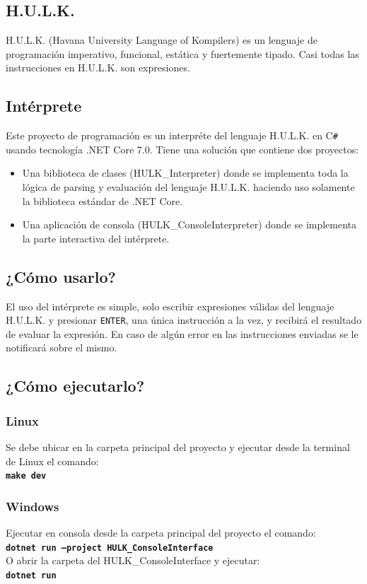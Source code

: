 \documentclass[12pt,a4paper]{article}
\begin{document}
\subsection{H.U.L.K.}\label{sub:hulk}
H.U.L.K. (Havana University Language of Kompilers) es un lenguaje de programación imperativo, funcional, estática y fuertemente tipado. Casi todas las instrucciones en H.U.L.K. son expresiones.
\subsection{Intérprete}\label{sub:interpreter}
Este proyecto de programación es un interpréte del lenguaje H.U.L.K. en C\texttt{\#} usando tecnología .NET Core 7.0. Tiene una solución que contiene dos proyectos:
\begin{itemize}
	\item Una biblioteca de clases (HULK\_Interpreter) donde se implementa toda la lógica de parsing y evaluación del lenguaje H.U.L.K. haciendo uso solamente la biblioteca estándar de .NET Core.
	\item Una aplicación de consola (HULK\_ConsoleInterpreter) donde se implementa la parte interactiva del intérprete.
\end{itemize}
\subsection{¿Cómo usarlo?}\label{sub:use}
	El uso del intérprete es simple, solo escribir expresiones válidas del lenguaje H.U.L.K. y presionar \texttt{ENTER}, una única instrucción a la vez, y recibirá el resultado de evaluar la expresión. En caso de algún error en las instrucciones enviadas se le notificará sobre el mismo.
\subsection{¿Cómo ejecutarlo?}\label{sub:execute}
\subsubsection*{Linux} Se debe ubicar en la carpeta principal del proyecto y ejecutar desde la terminal de Linux el comando:\\
\texttt{\bf make dev}
\subsubsection*{Windows} Ejecutar en consola desde la carpeta principal del proyecto el comando:\\
\texttt{\bf dotnet run --project HULK\_ConsoleInterface}\\
O abrir la carpeta del HULK\_ConsoleInterface y ejecutar:\\ \texttt{\bf dotnet run} 
\end{document}
